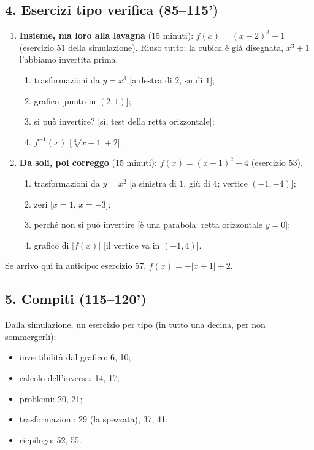 \documentclass[11pt]{report}
\begin{document}
\subsection*{4. Esercizi tipo verifica (85--115')}
\begin{enumerate}
  \item \textbf{Insieme, ma loro alla lavagna} (15 minuti): $f(x)=(x-2)^3+1$ (esercizio 51 della simulazione). Riuso tutto: la cubica è già disegnata, $x^3+1$ l'abbiamo invertita prima.
  \begin{enumerate}
    \item trasformazioni da $y=x^3$ [a destra di $2$, su di $1$];
    \item grafico [punto  in $(2,1)$];
    \item si può invertire? [sì, test della retta orizzontale];
    \item $f^{-1}(x)$ [$\sqrt[3]{x-1}+2$].
  \end{enumerate}
  \item \textbf{Da soli, poi correggo} (15 minuti): $f(x)=(x+1)^2-4$ (esercizio 53).
  \begin{enumerate}
    \item trasformazioni da $y=x^2$ [a sinistra di $1$, giù di $4$; vertice $(-1,-4)$];
    \item zeri [$x=1$, $x=-3$];
    \item perché non si può invertire [è una parabola: retta orizzontale $y=0$];
    \item grafico di $\lvert f(x)\rvert$ [il vertice va in $(-1,4)$].
  \end{enumerate}
\end{enumerate}
Se arrivo qui in anticipo: esercizio 57, $f(x)=-\lvert x+1\rvert+2$.

\subsection*{5. Compiti (115--120')}
Dalla simulazione, un esercizio per tipo (in tutto una decina, per non sommergerli):
\begin{itemize}
  \item invertibilità dal grafico: 6, 10;
  \item calcolo dell'inversa: 14, 17;
  \item problemi: 20, 21;
  \item trasformazioni: 29 (la spezzata), 37, 41;
  \item riepilogo: 52, 55.
\end{itemize}
\end{document}
